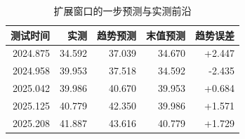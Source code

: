 \begin{table}[!htbp]
\centering
\songti{}
\setlength{\tabcolsep}{4pt}
\caption{扩展窗口的一步预测与实测前沿}
\label{tab:q4-backtest}
\begin{tabular}{rrrrr}
\toprule
测试时间 & 实测 & 趋势预测 & 末值预测 & 趋势误差 \\
\midrule
2024.875 & 34.592 & 37.039 & 34.670 & +2.447 \\
2024.958 & 39.953 & 37.518 & 34.592 & -2.435 \\
2025.042 & 39.986 & 40.670 & 39.953 & +0.684 \\
2025.125 & 40.779 & 42.350 & 39.986 & +1.571 \\
2025.208 & 41.887 & 43.616 & 40.779 & +1.729 \\
\bottomrule
\end{tabular}
\end{table}
